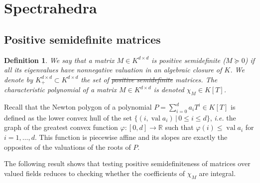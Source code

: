 \documentclass[sigconf]{acmart}
\newcommand{\R}{\mathbb{R}} %
\newtheorem{definition}[theorem]{Definition}
\DeclareMathOperator{\val}{val}
\providecommand{\DIFaddtex}[1]{{\protect\color{blue}\uwave{#1}}} %
\providecommand{\DIFdeltex}[1]{{\protect\color{red}\sout{#1}}}                      %
\providecommand{\DIFaddbegin}{} %
\providecommand{\DIFaddend}{} %
\providecommand{\DIFdelbegin}{} %
\providecommand{\DIFdelend}{} %
\providecommand{\DIFadd}[1]{\texorpdfstring{\DIFaddtex{#1}}{#1}} %
\providecommand{\DIFdel}[1]{\texorpdfstring{\DIFdeltex{#1}}{}} %
\newcommand{\DIFscaledelfig}{0.5}
\newlength{\DIFdelgraphicswidth} %
\newlength{\DIFdelgraphicsheight} %
\newcommand{\DIFaddincludegraphics}[2][]{{\color{blue}\fbox{\DIFOincludegraphics[#1]{#2}}}} %
\newcommand{\DIFdelincludegraphics}[2][]{%
\sbox{\DIFdelgraphicsbox}{\DIFOincludegraphics[#1]{#2}}%
\settoboxwidth{\DIFdelgraphicswidth}{\DIFdelgraphicsbox} %
\settoboxtotalheight{\DIFdelgraphicsheight}{\DIFdelgraphicsbox} %
\scalebox{\DIFscaledelfig}{%
\parbox[b]{\DIFdelgraphicswidth}{\usebox{\DIFdelgraphicsbox}\\[-\baselineskip] \rule{\DIFdelgraphicswidth}{0em}}\llap{\resizebox{\DIFdelgraphicswidth}{\DIFdelgraphicsheight}{%
\setlength{\unitlength}{\DIFdelgraphicswidth}%
\begin{picture}(1,1)%
\thicklines\linethickness{2pt} %
{\color[rgb]{1,0,0}\put(0,0){\framebox(1,1){}}}%
{\color[rgb]{1,0,0}\put(0,0){\line( 1,1){1}}}%
{\color[rgb]{1,0,0}\put(0,1){\line(1,-1){1}}}%
\end{picture}%
}\hspace*{3pt}}} %
} %
\DeclareRobustCommand{\DIFaddbegin}{\DIFOaddbegin \let\includegraphics\DIFaddincludegraphics} %
\DeclareRobustCommand{\DIFaddend}{\DIFOaddend \let\includegraphics\DIFOincludegraphics} %
\DeclareRobustCommand{\DIFdelbegin}{\DIFOdelbegin \let\includegraphics\DIFdelincludegraphics} %
\DeclareRobustCommand{\DIFdelend}{\DIFOaddend \let\includegraphics\DIFOincludegraphics} %
\begin{document}
\section{Spectrahedra}
\label{sec:spectrahedra}

\subsection{Positive semidefinite matrices}
\newcommand\Mat{Positive semidefinite matrix }
\newcommand\mats{positive semidefinite matrices }
\newcommand\Mats{positive semidefinite matrices }

\begin{definition}
  We say that a matrix $M \in K^{d \times d}$ is {positive semidefinite\DIFaddbegin \DIFadd{, or psd}\DIFaddend } ($M \succeq 0$)
  if all its eigenvalues have nonnegative valuation in an algebraic closure of $K$.
  We denote by $K^{d \times d}_+ \subset K^{d\times d}$ the set of \DIFdelbegin \DIFdel{positive semidefinite }\DIFdelend \DIFaddbegin \DIFadd{psd }\DIFaddend matrices.
  The characteristic polynomial of a matrix $M \in K^{d\times d}$ is denoted $\chi_M \in K[T]$.
\end{definition}

Recall that the {Newton polygon} of a polynomial $P = \sum_{i=0}^{d} a_i T^i \in K[T]$ is
defined as the lower convex hull of the set $\{(i, \val a_i) \,|\, 0 \le i \le d\}$, {\it i.e.} the
graph of the greatest convex function $\varphi : [0,d] \to \R$ such that $\varphi(i) \leq \val a_i$
for $i=1,\ldots,d$. This function is piecewise affine and its slopes are exactly the opposites of the valuations
of the roots of $P$.

The following result shows that testing positive semidefiniteness of matrices over
valued fields reduces to checking whether the coefficients of $\chi_M$ are integral.
\end{document}
